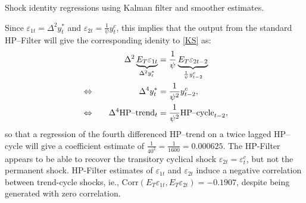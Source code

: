\documentclass[a4paper,final,12pt]{article}
\begin{document}

\begin{table}[h!]
  \vspace{-3mm}
  \caption{Shock identity regressions using Kalman filter and smoother
  estimates.}
  \label{tab:KF}
  \end{table}

Since $\varepsilon _{1t}=\Delta ^{2}y_{t}^{\ast }$ and $\varepsilon _{2t}=%
\frac{1}{\psi }y_{t}^{c}$, this implies that the output from the standard
HP--Filter will give the corresponding idenity to \ref{KS} as:%
\begin{alignat}{2}
& & \Delta ^{2}\underbrace{E_{T}\varepsilon _{1t}}_{\Delta ^{2}y_{t}^{\ast
}}& =\frac{1}{\psi }\underbrace{E_{T}\varepsilon _{2t-2}}_{\frac{1}{\psi }%
y_{t-2}^{c}}  \notag \\
& \Leftrightarrow & \Delta ^{4}y_{t}^{\ast }& =\frac{1}{\psi ^{2}}%
y_{t-2}^{c},  \notag \\
& \Leftrightarrow ~~~ & \Delta ^{4}\text{HP--trend}_{t}& =\frac{1}{\psi ^{2}}%
\text{HP--cycle}_{t-2},  \notag
\end{alignat}%
so that a regression of the fourth differenced HP--trend on a twice lagged
HP--cycle will give a coefficient estimate of $\frac{1}{40^{2}}=\frac{1}{1600%
}=0.000625$. The HP-Filter appears to be able to recover the transitory
cyclical shock $\varepsilon _{2t}=\varepsilon _{t}^{c}$, but not the
permanent shock. HP-Filter estimates of $\varepsilon _{1t}$ and $\varepsilon
_{2t}$ induce a negative correlation between trend-cycle shocks, ie., $%
\mathrm{Corr}(E_{T}\varepsilon _{1t},E_{T}\varepsilon _{2t})=-0.1907$,
despite being generated with zero correlation.

\bigskip

\bigskip

\bigskip

\bigskip

\bigskip

\bigskip

\bigskip

\bigskip

\bigskip

\bigskip

\bigskip

\bigskip

\bigskip

\bigskip
\end{document}
